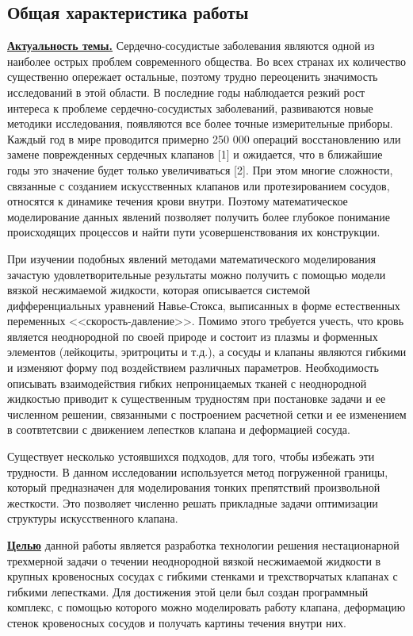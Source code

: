 \subsection*{\Large Общая характеристика работы}
\fontsize{14pt}{15pt}\selectfont
\underline{\textbf{Актуальность темы.}}
Сердечно-сосудистые заболевания являются одной из наиболее острых проблем современного общества. Во всех странах их количество существенно опережает остальные, поэтому трудно переоценить значимость исследований в этой области. В последние годы наблюдается резкий рост интереса к проблеме сердечно-сосудистых заболеваний, развиваются новые методики исследования, появляются все более точные измерительные приборы. Каждый год в мире проводится примерно 250 000 операций восстановлению или замене поврежденных сердечных клапанов [1] и ожидается, что в ближайшие годы это значение будет только увеличиваться [2]. При этом многие сложности, связанные с созданием искусственных клапанов или протезированием сосудов, относятся к динамике течения крови внутри. Поэтому математическое моделирование данных явлений позволяет получить более глубокое понимание происходящих процессов и найти пути усовершенствования их конструкции. 

При изучении подобных явлений методами математического моделирования зачастую удовлетворительные результаты можно получить с помощью модели вязкой несжимаемой жидкости, которая описывается системой дифференциальных уравнений Навье-Стокса, выписанных в форме естественных переменных <<скорость-давление>>. Помимо этого требуется учесть, что кровь является неоднородной по своей природе и состоит из плазмы и форменных элементов (лейкоциты, эритроциты и т.д.), а сосуды и клапаны являются гибкими и изменяют форму под воздействием различных параметров. Необходимость описывать взаимодействия гибких непроницаемых тканей с неоднородной жидкостью приводит к существенным трудностям при постановке задачи и ее численном решении, связанными с построением расчетной сетки и ее изменением в соотвтетсвии с движением лепестков клапана и деформацией сосуда. 

Существует несколько устоявшихся подходов, для того, чтобы избежать эти трудности. В данном исследовании используется метод погруженной границы, который предназначен для моделирования тонких препятствий произвольной жесткости. Это позволяет численно решать прикладные задачи оптимизации структуры искусственного клапана.


\underline{\textbf{Целью}} данной работы является разработка технологии решения нестационарной трехмерной задачи о течении неоднородной вязкой несжимаемой жидкости в крупных кровеносных сосудах с гибкими стенками и трехстворчатых клапанах с гибкими лепестками. Для достижения этой цели был создан программный комплекс, с помощью которого можно моделировать работу клапана, деформацию стенок кровеносных сосудов и получать картины течения внутри них.


